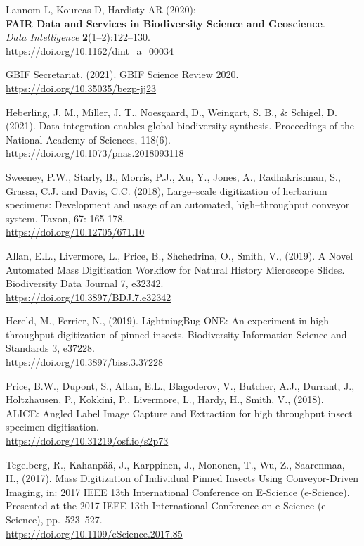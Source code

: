 \begin{thebibliography}{9}
 Lannom L, Koureas D, Hardisty AR (2020):\\
\textbf{FAIR Data and Services in Biodiversity Science and
Geoscience}.\\
\emph{Data Intelligence} \textbf{2}(1--2):122--130.\\
\url{https://doi.org/10.1162/dint_a_00034}

 GBIF Secretariat. (2021). GBIF Science Review 2020.\\
\url{https://doi.org/10.35035/bezp-jj23}

 Heberling, J. M., Miller, J. T., Noesgaard, D., Weingart, S. B.,
\& Schigel, D. (2021). Data integration enables global biodiversity
synthesis. Proceedings of the National Academy of Sciences, 118(6).\\
\url{https://doi.org/10.1073/pnas.2018093118}

 Sweeney, P.W., Starly, B., Morris, P.J., Xu, Y., Jones, A.,
Radhakrishnan, S., Grassa, C.J. and Davis, C.C. (2018), Large--scale
digitization of herbarium specimens: Development and usage of an
automated, high--throughput conveyor system. Taxon, 67: 165-178.\\
\url{https://doi.org/10.12705/671.10}

 Allan, E.L., Livermore, L., Price, B., Shchedrina, O., Smith,
V., (2019). A Novel Automated Mass Digitisation Workflow for Natural
History Microscope Slides. Biodiversity Data Journal 7, e32342.\\
\url{https://doi.org/10.3897/BDJ.7.e32342}

 Hereld, M., Ferrier, N., (2019). LightningBug ONE: An
experiment in high-throughput digitization of pinned insects.
Biodiversity Information Science and Standards 3, e37228.\\
\url{https://doi.org/10.3897/biss.3.37228}

 Price, B.W., Dupont, S., Allan, E.L., Blagoderov, V., Butcher,
A.J., Durrant, J., Holtzhausen, P., Kokkini, P., Livermore, L., Hardy,
H., Smith, V., (2018). ALICE: Angled Label Image Capture and Extraction
for high throughput insect specimen digitisation.\\
\url{https://doi.org/10.31219/osf.io/s2p73}

 Tegelberg, R., Kahanpää, J., Karppinen, J., Mononen, T., Wu,
Z., Saarenmaa, H., (2017). Mass Digitization of Individual Pinned
Insects Using Conveyor-Driven Imaging, in: 2017 IEEE 13th International
Conference on E-Science (e-Science). Presented at the 2017 IEEE 13th
International Conference on e-Science (e-Science), pp.~523--527.\\
\url{https://doi.org/10.1109/eScience.2017.85}


\end{thebibliography}
